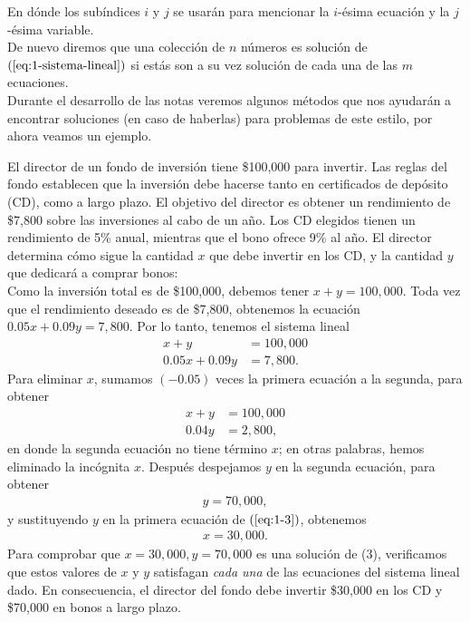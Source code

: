 En dónde los subíndices $i$ y $j$ se usarán para mencionar la $i$-ésima ecuación y la $j$-ésima variable.\\
De nuevo diremos que una colección de $n$ números es solución de $(\ref{eq:1-sistema-lineal})$ si estás son a su vez solución de cada una de las $m$ ecuaciones.\\
Durante el desarrollo de las notas veremos algunos métodos que nos ayudarán a encontrar soluciones (en caso de haberlas) para problemas de este estilo, por ahora veamos un ejemplo.
\begin{example}
  El director de un fondo de inversión tiene \$100,000 para invertir. Las reglas del fondo establecen que la inversión debe hacerse tanto en certificados de depósito (CD), como a largo plazo. El objetivo del director es obtener un rendimiento de \$7,800 sobre las inversiones al cabo de un año. Los CD elegidos tienen un rendimiento de 5\% anual, mientras que el bono ofrece 9\% al año. El director determina cómo sigue la cantidad \( x \) que debe invertir en los CD, y la cantidad \( y \) que dedicará a comprar bonos:\\
  Como la inversión total es de \$100,000, debemos tener \( x + y = 100,000 \). Toda vez que el rendimiento deseado es de \$7,800, obtenemos la ecuación \( 0.05x + 0.09y = 7,800 \). Por lo tanto, tenemos el sistema lineal
  \begin{equation}\label{eq:1-3}
    \begin{aligned}
      x + y &= 100,000 \\
      0.05x + 0.09y &= 7,800.
    \end{aligned}
  \end{equation}
  Para eliminar \( x \), sumamos \( (-0.05) \) veces la primera ecuación a la segunda, para obtener
  \begin{align*}
    x + y &= 100,000 \\
    0.04y &= 2,800,
  \end{align*}
  en donde la segunda ecuación no tiene término \( x \); en otras palabras, hemos eliminado la incógnita \( x \). Después despejamos \( y \) en la segunda ecuación, para obtener
  \begin{align*}
    y=70,000,
  \end{align*}
  y sustituyendo \( y \) en la primera ecuación de $(\ref{eq:1-3})$, obtenemos
  \begin{align*}
    x=30,000.
  \end{align*}
  Para comprobar que \( x = 30,000, y = 70,000 \) es una solución de (3), verificamos que estos valores de \( x \) y \( y \) satisfagan \textit{cada una} de las ecuaciones del sistema lineal dado. En consecuencia, el director del fondo debe invertir \$30,000 en los CD y \$70,000 en bonos a largo plazo.
\end{example}

